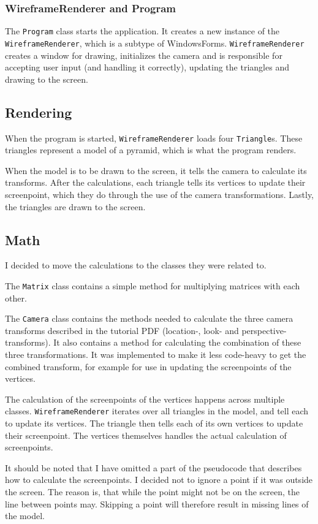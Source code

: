 \subsubsection*{WireframeRenderer and Program}
The \texttt{Program} class starts the application. It creates a new instance of the \texttt{WireframeRenderer}, which is a subtype of WindowsForms. \texttt{WireframeRenderer} creates a window for drawing, initializes the camera and is responsible for accepting user input (and handling it correctly), updating the triangles and drawing to the screen.

\subsection{Rendering}
\label{03_02}
When the program is started, \texttt{WireframeRenderer} loads four \texttt{Triangle}s. These triangles represent a model of a pyramid, which is what the program renders.

When the model is to be drawn to the screen, it tells the camera to calculate its transforms. After the calculations, each triangle tells its vertices to update their screenpoint, which they do through the use of the camera transformations. Lastly, the triangles are drawn to the screen.

\subsection{Math}
\label{03_03}
I decided to move the calculations to the classes they were related to.

The \texttt{Matrix} class contains a simple method for multiplying matrices with each other.

The \texttt{Camera} class contains the methods needed to calculate the three camera transforms described in the tutorial PDF (location-, look- and perspective-transforms). It also contains a method for calculating the combination of these three transformations. It was implemented to make it less code-heavy to get the combined transform, for example for use in updating the screenpoints of the vertices.

The calculation of the screenpoints of the vertices happens across multiple classes. \texttt{WireframeRenderer} iterates over all triangles in the model, and tell each to update its vertices. The triangle then tells each of its own vertices to update their screenpoint. The vertices themselves handles the actual calculation of screenpoints.

It should be noted that I have omitted a part of the pseudocode that describes how to calculate the screenpoints. I decided not to ignore a point if it was outside the screen. The reason is, that while the point might not be on the screen, the line between points may. Skipping a point will therefore result in missing lines of the model.